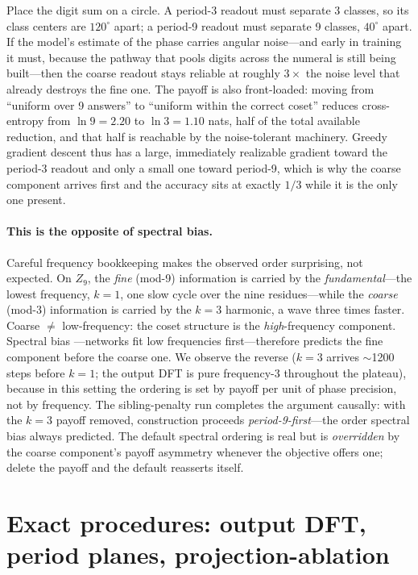 \documentclass{article} %
\begin{document}
Place the digit sum on a circle. A period-3 readout must separate 3 classes, so its class centers are $120^\circ$ apart; a period-9 readout must separate 9 classes, $40^\circ$ apart. If the model's estimate of the phase carries angular noise---and early in training it must, because the pathway that pools digits across the numeral is still being built---then the coarse readout stays reliable at roughly $3\times$ the noise level that already destroys the fine one. The payoff is also front-loaded: moving from ``uniform over 9 answers'' to ``uniform within the correct coset'' reduces cross-entropy from $\ln 9 = 2.20$ to $\ln 3 = 1.10$ nats, half of the total available reduction, and that half is reachable by the noise-tolerant machinery. Greedy gradient descent thus has a large, immediately realizable gradient toward the period-3 readout and only a small one toward period-9, which is why the coarse component arrives first and the accuracy sits at exactly $1/3$ while it is the only one present.

\paragraph{This is the opposite of spectral bias.} Careful frequency bookkeeping makes the observed order surprising, not expected. On $Z_9$, the \emph{fine} (mod-9) information is carried by the \emph{fundamental}---the lowest frequency, $k=1$, one slow cycle over the nine residues---while the \emph{coarse} (mod-3) information is carried by the $k=3$ harmonic, a wave three times faster. Coarse $\ne$ low-frequency: the coset structure is the \emph{high}-frequency component. Spectral bias \citep{rahaman2019spectral}---networks fit low frequencies first---therefore predicts the fine component before the coarse one. We observe the reverse ($k=3$ arrives $\sim$1200 steps before $k=1$; the output DFT is pure frequency-3 throughout the plateau), because in this setting the ordering is set by payoff per unit of phase precision, not by frequency. The sibling-penalty run completes the argument causally: with the $k=3$ payoff removed, construction proceeds \emph{period-9-first}---the order spectral bias always predicted. The default spectral ordering is real but is \emph{overridden} by the coarse component's payoff asymmetry whenever the objective offers one; delete the payoff and the default reasserts itself.

\section{Exact procedures: output DFT, period planes, projection-ablation}
\label{app:procedures}
\end{document}
